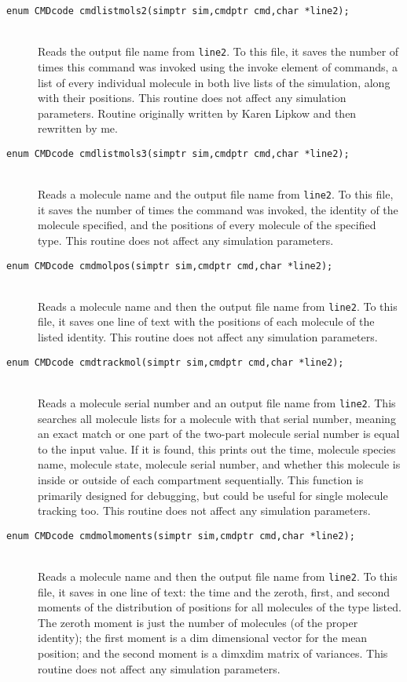 \documentclass {scrbook}
\newcommand {\ttt} {\texttt}
\begin{document}
\begin{description}
\item[\ttt{enum CMDcode cmdlistmols2(simptr sim,cmdptr cmd,char *line2);}]
\hfill \\
Reads the output file name from \ttt{line2}. To this file, it saves the number of times this command was invoked using the invoke element of commands, a list of every individual molecule in both live lists of the simulation, along with their positions. This routine does not affect any simulation parameters. Routine originally written by Karen Lipkow and then rewritten by me.

\item[\ttt{enum CMDcode cmdlistmols3(simptr sim,cmdptr cmd,char *line2);}]
\hfill \\
Reads a molecule name and the output file name from \ttt{line2}. To this file, it saves the number of times the command was invoked, the identity of the molecule specified, and the positions of every molecule of the specified type. This routine does not affect any simulation parameters.

\item[\ttt{enum CMDcode cmdmolpos(simptr sim,cmdptr cmd,char *line2);}]
\hfill \\
Reads a molecule name and then the output file name from \ttt{line2}. To this file, it saves one line of text with the positions of each molecule of the listed identity. This routine does not affect any simulation parameters.

\item[\ttt{enum CMDcode cmdtrackmol(simptr sim,cmdptr cmd,char *line2);}]
\hfill \\
Reads a molecule serial number and an output file name from \ttt{line2}. This searches all molecule lists for a molecule with that serial number, meaning an exact match or one part of the two-part molecule serial number is equal to the input value. If it is found, this prints out the time, molecule species name, molecule state, molecule serial number, and whether this molecule is inside or outside of each compartment sequentially. This function is primarily designed for debugging, but could be useful for single molecule tracking too. This routine does not affect any simulation parameters.

\item[\ttt{enum CMDcode cmdmolmoments(simptr sim,cmdptr cmd,char *line2);}]
\hfill \\
Reads a molecule name and then the output file name from \ttt{line2}. To this file, it saves in one line of text: the time and the zeroth, first, and second moments of the distribution of positions for all molecules of the type listed. The zeroth moment is just the number of molecules (of the proper identity); the first moment is a dim dimensional vector for the mean position; and the second moment is a dimxdim matrix of variances. This routine does not affect any simulation parameters.


\end{description}
\end{document}
